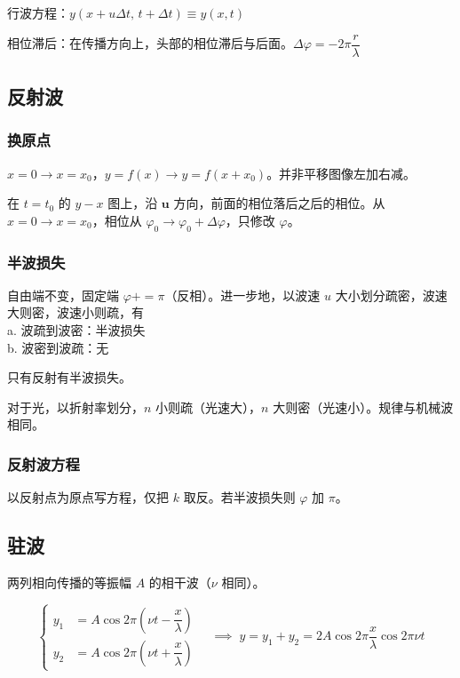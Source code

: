 \documentclass[12pt, a4paper, UTF8, openany]{ctexbook}
\newcommand{\vect}[1]{\mathbf{#1}}
\begin{document}
        行波方程：$y(x + u \Delta t, \, t + \Delta t) \equiv y(x, t)$

        {\heiti 相位滞后}：在传播方向上，头部的相位滞后与后面。$\Delta\varphi = - 2\pi \dfrac{r}{\lambda}$

        \subsection{反射波}
        \subsubsection{换原点}
        $x = 0 \to x = x_0$，$y = f(x) \to y = f(x + x_0)$。并非平移图像左加右减。

        在 $t = t_0$ 的 $y-x$ 图上，沿 $\vect{u}$ 方向，前面的相位落后之后的相位。从 $x = 0 \to x = x_0$，相位从 $\varphi_0 \to \varphi_0 + \Delta\varphi$，只修改 $\varphi$。

        \subsubsection{半波损失}
        自由端不变，固定端 $\varphi += \pi$（反相）。进一步地，以波速 $u$ 大小划分疏密，波速大则密，波速小则疏，有 \\
        a. 波疏到波密：半波损失 \\
        b. 波密到波疏：无

        {\heiti 只有反射有半波损失}。

        对于光，以折射率划分，$n$ 小则疏（光速大），$n$ 大则密（光速小）。规律与机械波相同。

        \subsubsection{反射波方程}
        以反射点为原点写方程，仅把 $k$ 取反。若半波损失则 $\varphi$ 加 $\pi$。

        \subsection{驻波}
        两列相向传播的等振幅 $A$ 的相干波（$\nu$ 相同）。

        $$\begin{cases}
            y_1 &= A\cos 2\pi (\nu t - \dfrac{x}{\lambda}) \\
            y_2 &= A\cos 2\pi (\nu t + \dfrac{x}{\lambda})
        \end{cases} \quad \implies \; y = y_1 + y_2 = 2A \boxed{\cos 2\pi\dfrac{x}{\lambda}} \cos 2\pi\nu t$$
\end{document}
